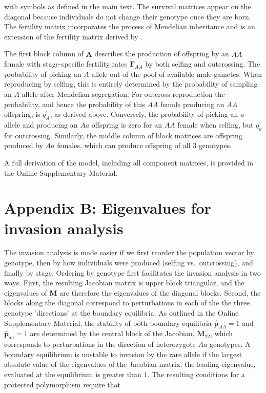 \documentclass[11pt]{article}
\def\mbf#1{\mathbf{#1}}
\begin{document}
\noindent with symbols as defined in the main text. The survival matrices appear on the diagonal because individuals do not change their genotype once they are born. The fertility matrix incorporates the process of Mendelian inheritance and is an extension of the fertility matrix derived by \citet{deVriesCaswell2019a}.

The first block column of $\tilde{\mbf{A}}$ describes the production of offspring by an $AA$ female with stage-specific fertility rates $\mbf{F}_{AA}$ by both selfing and outcrossing. The probability of picking an $A$ allele out of the pool of available male gametes. When reproducing by selfing, this is entirely determined by the probability of sampling an $A$ allele after Mendelian segregation. For outcross reproduction the probability, and hence the probability of this $AA$ female producing an $AA$ offspring, is $q^{\prime}_{A}$, as derived above. Conversely, the probability of picking an $a$ allele and producing an $Aa$ offspring is zero for an $AA$ female when selfing, but $q^{\prime}_a$ for outcrossing. Similarly, the middle column of block matrices are offspring produced by $Aa$ females, which can produce offspring of all $3$ genotypes.

A full derivation of the model, including all component matrices, is provided in the Online Supplementary Material. 


\section*{Appendix B: Eigenvalues for invasion analysis}
\renewcommand{\theequation}{B\arabic{equation}}
\setcounter{equation}{0}  %
\setcounter{table}{0}  %

The invasion analysis is made easier if we first reorder the population vector by genotype, then by how individuals were produced (selfing vs.~outcrossing), and finally by stage. Ordering by genotype first facilitates the invasion analysis in two ways. First, the resulting Jacobian matrix is upper block triangular, and the eigenvalues of $\mbf{M}$ are therefore the eigenvalues of the diagonal blocks. Second, the blocks along the diagonal correspond to perturbations in each of the the three genotype 'directions' at the boundary equilibria. As outlined in the Online Supplementary Material, the stability of both boundary equilibria $\hat{\mbf{p}}_{AA} = 1$ and $\hat{\mbf{p}}_{aa} = 1$ are determined by the central block of the Jacobian, $\mbf{M}_{22}$, which corresponds to perturbations in the direction of heterozygote $Aa$ genotypes. A boundary equilibrium is unstable to invasion by the rare allele if the largest absolute value of the eigenvalues of the Jacobian matrix, the leading eigenvalue, evaluated at the equilibrium is greater than $1$. The resulting conditions for a protected polymorphism require that
\end{document}
